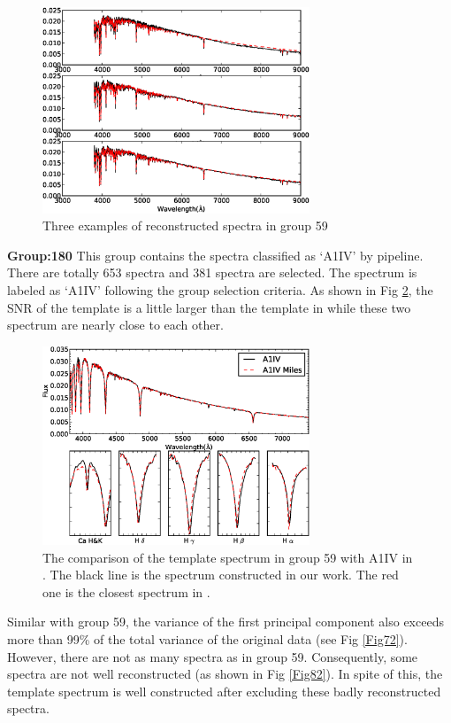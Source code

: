 \documentclass[referee]{raa}            %
\begin{document}
 \begin{figure}
   \centering
   \includegraphics[width=8cm, angle=0,clip]{f81.eps}
   \caption{Three examples of reconstructed spectra in group 59
   }
   \label{Fig81}
\end{figure}


\textbf{Group:180}
This group contains the spectra classified as `A1IV' by pipeline.
There are totally 653 spectra and 381 spectra are selected.
The spectrum is labeled as `A1IV' following the group selection criteria.
As shown in Fig \ref{Fig92}, the SNR of the template is a little larger than the template in \citet{luo2012dr1} while these two spectrum are nearly close to each other.
\begin{figure}
   \centering
   \includegraphics[width=8cm, angle=0,clip]{f92.eps}
   \caption{The comparison of the template spectrum in group 59 with  A1IV in \citet{luo2012dr1}.
The black line is the spectrum constructed in our work.
The red one is the closest spectrum in \citet{luo2012dr1}.
   }
   \label{Fig92}
\end{figure}

Similar with group 59, the variance of the first  principal component also exceeds more than 99\% of the total variance of the original data (see Fig \ref{Fig72}).
However, there are not as many spectra as in group 59.
Consequently, some  spectra are not well reconstructed (as shown in Fig \ref{Fig82}).
In spite of this, the template spectrum is well constructed after excluding these badly reconstructed spectra.
\end{document}
